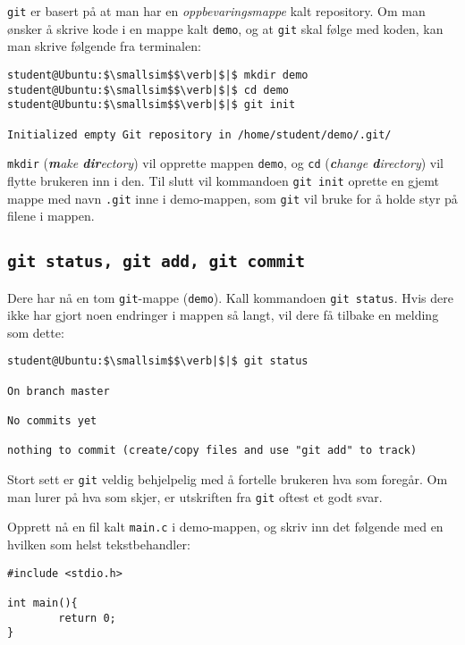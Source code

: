 \begin{alphasection}
\verb|git| er basert på at man har en \textit{oppbevaringsmappe} kalt repository. Om man ønsker å skrive kode i en mappe kalt \verb|demo|, og at \verb|git| skal følge med koden, kan man skrive følgende fra terminalen: 

\begin{lstlisting}[mathescape=true]
student@Ubuntu:$\smallsim$$\verb|$|$ mkdir demo
student@Ubuntu:$\smallsim$$\verb|$|$ cd demo
student@Ubuntu:$\smallsim$$\verb|$|$ git init

Initialized empty Git repository in /home/student/demo/.git/
\end{lstlisting}

\verb|mkdir| (\textit{\textbf{m}ake \textbf{dir}ectory}) vil opprette mappen \verb|demo|, og \verb|cd| (\textit{\textbf{c}hange \textbf{d}irectory}) vil flytte brukeren inn i den. Til slutt vil kommandoen \verb|git init| oprette en gjemt mappe med navn \verb|.git| inne i demo-mappen, som \verb|git| vil bruke for å holde styr på filene i mappen.

\subsection{\texttt{git status, git add, git commit}}


Dere har nå en tom \verb|git|-mappe (\verb|demo|). Kall kommandoen \verb|git status|. Hvis dere ikke har gjort noen endringer i mappen så langt, vil dere få tilbake en melding som dette:

\begin{lstlisting}[mathescape=true]
student@Ubuntu:$\smallsim$$\verb|$|$ git status

On branch master

No commits yet

nothing to commit (create/copy files and use "git add" to track)
\end{lstlisting}


Stort sett er \verb|git| veldig behjelpelig med å fortelle brukeren hva som foregår. Om man lurer på hva som skjer, er utskriften fra \verb|git| oftest et godt svar.

Opprett nå en fil kalt \verb|main.c| i demo-mappen, og skriv inn det følgende med en hvilken som helst tekstbehandler:

\begin{lstlisting}
#include <stdio.h>

int main(){
        return 0;
}
\end{lstlisting}


\end{alphasection}
